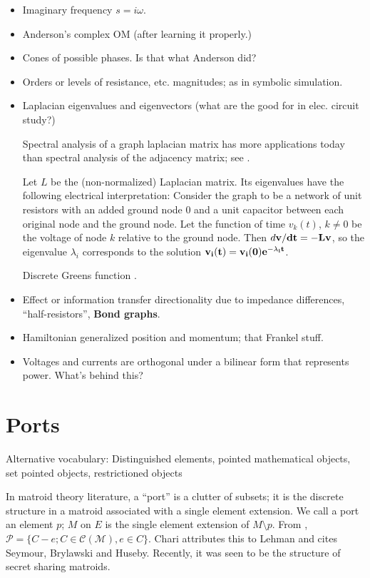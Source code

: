 \documentclass{article}
\begin{document}
\begin{itemize}
\item Imaginary frequency $s=i\omega$.
\item Anderson's complex OM (after learning it properly.)
\item Cones of possible phases.  Is that what Anderson did?
\item Orders or levels of resistance, etc. magnitudes; as
in symbolic simulation.
\item Laplacian eigenvalues and eigenvectors  (what are the good for in elec. circuit
study?) 

Spectral analysis of a graph laplacian matrix has more applications today than
spectral analysis of the adjacency matrix; see \cite{ChungSpectralGraphTheory}.

Let $L$ be the (non-normalized) Laplacian matrix.  Its eigenvalues have the 
following electrical interpretation:  
Consider the graph to be a network of unit resistors with an added ground 
node $0$ and a unit capacitor between each original node and the ground node.  
Let the function of time $v_k(t)$, $k\neq 0$ be the voltage of node $k$ 
relative to 
the ground node.  Then $d\bf{v}/dt = -L\bf{v}$, so the eigenvalue $\lambda_i$
corresponds to the solution $\bf{v}_i(t) = \bf{v}_i(0)e^{-\lambda_i t}$.

Discrete Greens function \cite{ChungYaoDiscreteGreensFn}.

\item Effect or information transfer directionality due to impedance
differences, ``half-resistors'',  \textbf{Bond graphs}.
\item Hamiltonian generalized position and momentum; that Frankel stuff.
\item Voltages and currents are orthogonal under a bilinear form that 
represents power.  What's behind this?
\end{itemize}

\section{Ports}

Alternative vocabulary: 
Distinguished elements, pointed mathematical objects, set pointed objects, 
restrictioned objects

In matroid theory literature, a ``port'' is a clutter of subsets; it is the 
discrete structure in a matroid associated with a single element extension.
We call a port an element $p$; $M$ on $E$ is the single element extension
of $M\setminus p$.  From \cite{MatroidPortsSteinerShellChari}, 
$\mathcal{P}= \{ C - e; C\in\mathcal{C}(\mathcal{M}), e\in C\}$.
Chari attributes this to Lehman and cites Seymour, Brylawski and Huseby.
Recently, it was seen to be the structure of secret sharing matroids.
\end{document}
